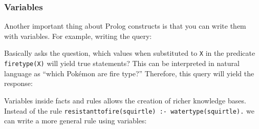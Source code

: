 \subsubsection{Variables}\label{logic-programming-paradigm.md__variables}

Another important thing about Prolog constructs is that you can write
them with variables. For example, writing the query:

\begin{Shaded}
\begin{Highlighting}[]
\NormalTok{)}
\end{Highlighting}
\end{Shaded}

Basically asks the question, which values when substituted to \texttt{X}
in the predicate \texttt{firetype(X)} will yield true statements? This
can be interpreted in natural language as ``which Pokémon are fire
type?'' Therefore, this query will yield the response:

\begin{Shaded}
\begin{Highlighting}[]
 \KeywordTok{=}
 \KeywordTok{=}
\end{Highlighting}
\end{Shaded}

Variables inside facts and rules allows the creation of richer knowledge
bases. Instead of the rule
\texttt{resistanttofire(squirtle)\ :-\ watertype(squirtle).} we can
write a more general rule using variables:

\begin{Shaded}
\begin{Highlighting}[]

\KeywordTok{,}\NormalTok{) }\KeywordTok{:{-}}\NormalTok{)}\KeywordTok{,}\NormalTok{)}
\KeywordTok{,}\NormalTok{) }\KeywordTok{:{-}}\NormalTok{)}\KeywordTok{,}\NormalTok{)}
\end{Highlighting}
\end{Shaded}

